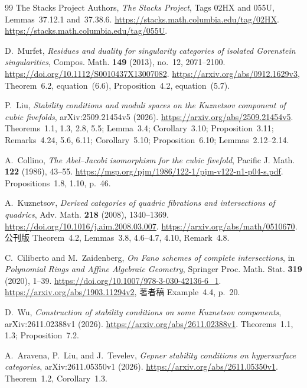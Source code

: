 \begin{thebibliography}{99}
The Stacks Project Authors,
\emph{The Stacks Project},
Tags 02HX and 055U,
Lemmas~37.12.1 and~37.38.6.
\url{https://stacks.math.columbia.edu/tag/02HX}.
\url{https://stacks.math.columbia.edu/tag/055U}.

D.~Murfet,
\emph{Residues and duality for singularity categories of isolated Gorenstein singularities},
Compos. Math. \textbf{149} (2013), no.~12, 2071--2100.
\url{https://doi.org/10.1112/S0010437X13007082}.
\url{https://arxiv.org/abs/0912.1629v3},
Theorem~6.2, equation~(6.6), Proposition~4.2, equation~(5.7).

P.~Liu,
\emph{Stability conditions and moduli spaces on the Kuznetsov component of cubic fivefolds},
arXiv:2509.21454v5 (2026).
\url{https://arxiv.org/abs/2509.21454v5}.
Theorems~1.1, 1.3, 2.8, 5.5; Lemma~3.4; Corollary~3.10;
Proposition~3.11; Remarks~4.24, 5.6, 6.11;
Corollary~5.10; Proposition~6.10; Lemmas~2.12--2.14.

A.~Collino,
\emph{The Abel--Jacobi isomorphism for the cubic fivefold},
Pacific J. Math. \textbf{122} (1986), 43--55.
\url{https://msp.org/pjm/1986/122-1/pjm-v122-n1-p04-s.pdf}.
Propositions~1.8, 1.10, p.~46.

A.~Kuznetsov,
\emph{Derived categories of quadric fibrations and intersections of quadrics},
Adv. Math. \textbf{218} (2008), 1340--1369.
\url{https://doi.org/10.1016/j.aim.2008.03.007}.
\url{https://arxiv.org/abs/math/0510670}.
公刊版 Theorem~4.2, Lemmas~3.8, 4.6--4.7, 4.10,
Remark~4.8.

C.~Ciliberto and M.~Zaidenberg,
\emph{On Fano schemes of complete intersections},
in \emph{Polynomial Rings and Affine Algebraic Geometry},
Springer Proc. Math. Stat. \textbf{319} (2020), 1--39.
\url{https://doi.org/10.1007/978-3-030-42136-6_1}.
\url{https://arxiv.org/abs/1903.11294v2},
著者稿 Example~4.4, p.~20.

D.~Wu,
\emph{Construction of stability conditions on some Kuznetsov components},
arXiv:2611.02388v1 (2026).
\url{https://arxiv.org/abs/2611.02388v1}.
Theorems~1.1, 1.3; Proposition~7.2.

A.~Aravena, P.~Liu, and J.~Tevelev,
\emph{Gepner stability conditions on hypersurface categories},
arXiv:2611.05350v1 (2026).
\url{https://arxiv.org/abs/2611.05350v1}.
Theorem~1.2, Corollary~1.3.


\end{thebibliography}
